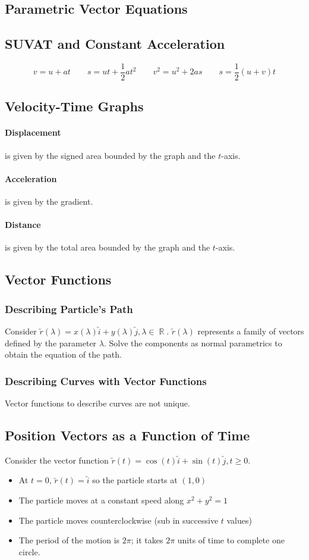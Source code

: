\documentclass[a4paper,twoside]{article}
\DeclareMathOperator\R{\mathbb{R}}
\begin{document}
		\subsection{Parametric Vector Equations}
			
		\subsection{SUVAT and Constant Acceleration}
			\[
				v=u+at \qquad s=ut+\frac{1}{2}at^2 \qquad v^2=u^2+2as \qquad s=\frac{1}{2}(u+v)t
			\]
		\subsection{Velocity-Time Graphs}
			\paragraph{Displacement} is given by the signed area bounded by the graph and the $t$-axis.
			\paragraph{Acceleration} is given by the gradient.
			\paragraph{Distance} is given by the total area bounded by the graph and the $t$-axis.
		\subsection{Vector Functions}
			\subsubsection{Describing Particle's Path}
				Consider $\utilde{r}(\lambda)=x(\lambda)\utilde{i}+y(\lambda)\utilde{j},\lambda\in\R$. $\utilde{r}(\lambda)$ represents a family of vectors defined by the parameter $\lambda$. Solve the components as normal parametrics to obtain the equation of the path.
			\subsubsection{Describing Curves with Vector Functions}
				Vector functions to describe curves are not unique.
		\subsection{Position Vectors as a Function of Time}
			Consider the vector function $\utilde{r}(t)=\cos(t)\utilde{i}+\sin(t)\utilde{j},t\geq0$.
			\begin{itemize}
				\item At $t=0$, $\utilde{r}(t)=\utilde{i}$ so the particle starts at $(1,0)$
				\item The particle moves at a constant speed along $x^2+y^2=1$
				\item The particle moves counterclockwise (sub in successive $t$ values)
				\item The period of the motion is $2\pi$; it takes $2\pi$ units of time to complete one circle.
			\end{itemize}
\end{document}
